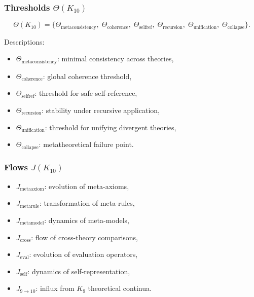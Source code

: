 \subsubsection{Thresholds $\Theta(K_{10})$}

\[
\Theta(K_{10})=
\{
\Theta_{\mathrm{metaconsistency}},\;
\Theta_{\mathrm{coherence}},\;
\Theta_{\mathrm{selfref}},\;
\Theta_{\mathrm{recursion}},\;
\Theta_{\mathrm{unification}},\;
\Theta_{\mathrm{collapse}}
\}.
\]

Descriptions:
\begin{itemize}
    \item $\Theta_{\mathrm{metaconsistency}}$: minimal consistency across theories,
    \item $\Theta_{\mathrm{coherence}}$: global coherence threshold,
    \item $\Theta_{\mathrm{selfref}}$: threshold for safe self-reference,
    \item $\Theta_{\mathrm{recursion}}$: stability under recursive application,
    \item $\Theta_{\mathrm{unification}}$: threshold for unifying divergent theories,
    \item $\Theta_{\mathrm{collapse}}$: metatheoretical failure point.
\end{itemize}

\subsubsection{Flows $J(K_{10})$}

\begin{itemize}
    \item $J_{\mathrm{metaaxiom}}$: evolution of meta-axioms,
    \item $J_{\mathrm{metarule}}$: transformation of meta-rules,
    \item $J_{\mathrm{metamodel}}$: dynamics of meta-models,
    \item $J_{\mathrm{cross}}$: flow of cross-theory comparisons,
    \item $J_{\mathrm{eval}}$: evolution of evaluation operators,
    \item $J_{\mathrm{self}}$: dynamics of self-representation,
    \item $J_{9\to10}$: influx from $K_9$ theoretical continua.
\end{itemize}

